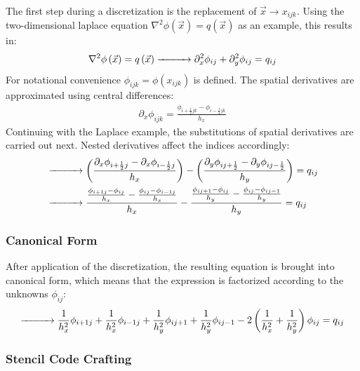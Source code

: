 The first step during a discretization is the replacement of $\vec{x}\rightarrow x_{ijk}$. Using the two-dimensional laplace equation $\nabla^2\phi(\vec{x})=q(\vec{x})$ as an example, this results in:
\begin{align*}
\nabla^2\phi\left(\vec{x}\right)=q\left(\vec{x}\right)
\xrightarrow{\makebox[1cm]{}}
\partial_x^2\phi_{ij}+
\partial_y^2\phi_{ij}
=
q_{ij}
\end{align*}
For notational convenience $\phi_{ijk} = \phi\left(x_{ijk}\right)$ is defined. The spatial derivatives are approximated using central differences:
\begin{align}
\partial_x\phi_{ijk} = \frac{\phi_{i+\frac{1}{2}jk} - \phi_{i-\frac{1}{2}jk}}{h_x}
\label{eq:pn_solver_central_difference}
\end{align}
Continuing with the Laplace example, the substitutions of spatial derivatives are carried out next. Nested derivatives affect the indices accordingly:
\begin{align*}
&
\xrightarrow{\makebox[1cm]{}}
\left(
\frac
{
\partial_x
\phi_{i+\frac{1}{2}j}
-
\partial_x
\phi_{i-\frac{1}{2}j}
}
{h_x}
\right)
-
\left(
\frac
{
\partial_y
\phi_{ij+\frac{1}{2}}
-
\partial_y
\phi_{ij-\frac{1}{2}}
}
{h_y}
\right)
=
q_{ij}
\\
&
\xrightarrow{\makebox[1cm]{}}
\frac
{
\frac{\phi_{i+1j} - \phi_{ij}}{h_x}
-
\frac{\phi_{ij} - \phi_{i-1j}}{h_x}
}
{h_x}
-
\frac
{
\frac{\phi_{ij+1} - \phi_{ij}}{h_y}
-
\frac{\phi_{ij} - \phi_{ij-1}}{h_y}
}
{h_y}
=
q_{ij}
\end{align*}

\subsubsection*{Canonical Form}
After application of the discretization, the resulting equation is brought into canonical form, which means that the expression is factorized according to the unknowns $\phi_{ij}$:
\begin{align}
\xrightarrow{\makebox[1cm]{}}
\frac{1}{h_x^2}\phi_{i+1j}
+\frac{1}{h_x^2}\phi_{i-1j}
+\frac{1}{h_y^2}\phi_{ij+1}
+\frac{1}{h_y^2}\phi_{ij-1}
-2\left(\frac{1}{h_x^2}+\frac{1}{h_y^2}\right)\phi_{ij}
=
q_{ij}
\label{eq:pn_laplace_canonical_form}
\end{align}

\subsubsection*{Stencil Code Crafting}

